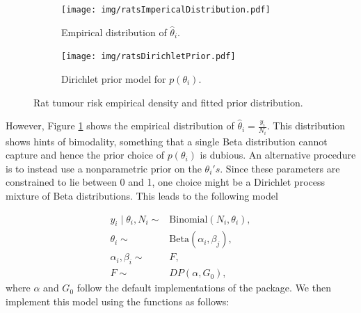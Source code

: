 \documentclass[nojss]{jss}
\begin{document}
\begin{figure}[tb]
\begin{subfigure}[b]{0.5\textwidth}
	\centering
	\texttt{[image: img/ratsImpericalDistribution.pdf]}
	\caption{Empirical distribution of $\hat{\theta}_i$.}
	\label{fig:ratsImperical}
\end{subfigure}
\begin{subfigure}[b]{0.5\textwidth}
	\centering
	\texttt{[image: img/ratsDirichletPrior.pdf]}
	\caption{Dirichlet prior model for $p(\theta _i)$.}
	\label{fig:rats_dirichlet_model}
\end{subfigure}
\caption{Rat tumour risk empirical density and fitted prior distribution.}
\end{figure}

However, Figure \ref{fig:ratsImperical} shows the empirical distribution of $\hat{\theta}_i = \frac{y_i}{N_i}$. This distribution shows hints of bimodality, something that a single Beta distribution cannot capture and hence the prior choice of $p(\theta_i)$ is dubious.
An alternative procedure is to instead use a nonparametric prior on the $\theta_i's$. Since these parameters are constrained to lie between 0 and 1, one choice might be a Dirichlet process mixture of Beta distributions. This leads to the following model

\begin{align*}
y_i \mid \theta_i, N_i \sim & \text{Binomial}(N_i,\theta_i), \\
\theta_i \sim & \text{Beta}(\alpha_i, \beta_j), \\
\alpha _i, \beta _i \sim & F, \\
F \sim & DP(\alpha, G_0),
\end{align*}
where $\alpha$ and $G_0$ follow the default implementations of the  package. We then implement this model using the  functions as follows:
\clearpage

\begin{Schunk}
\end{Schunk}
\end{document}

